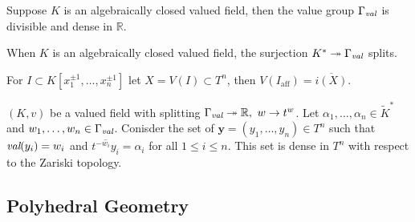     \begin{lemma}
        Suppose $K$ is an algebraically closed valued field, then the value group $\Gamma_{\emph{val}}$ is divisible and dense in $\mathbb{R}$.
    \end{lemma}

    \begin{lemma}
        When $K$ is an algebraically closed valued field, the surjection $K^{*} \twoheadrightarrow \Gamma_{\emph{val}}$ splits.
    \end{lemma}

    \begin{proposition}
        For $I \subset K[x_{1}^{\pm 1},\dots,x_{n}^{\pm 1}]$ let $X = V(I) \subset T^n$, then $V(I_{\text{aff}}) = \overline{i(X)}$.
    \end{proposition}

    \begin{proposition}
        \label{densenessprop}
        $(K,v)$ be a valued field with splitting $\Gamma_{\emph{val}} \twoheadrightarrow \mathbb{R},~w \to t^{w}$.
        Let $\alpha_{1}, \dots,\alpha_{n} \in \tilde{K}^{*}$ and $w_1, \dots, w_n \in \Gamma_{\emph{val}}$. 
        Conisder the set of $\textbf{y} = (y_1, \dots, y_n) \in T^{n}$ such that $\emph{val}(y_{i}) = w_{i}$ and $\overline{t^{-w_i}y_i} = \alpha_{i}$ for all $1\leq i \leq n$.
        This set is dense in $T^n$ with respect to the Zariski topology.
    \end{proposition}
\subsection{Polyhedral Geometry}

